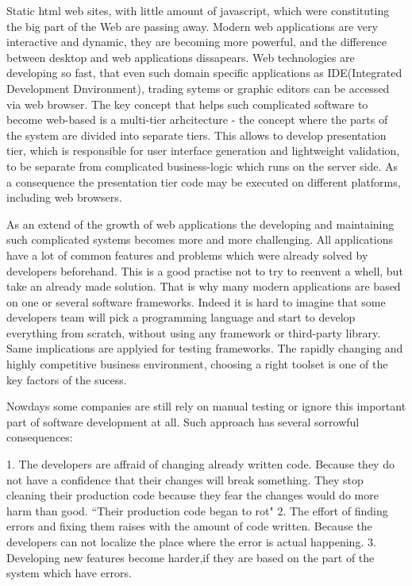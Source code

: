 \documentclass{article}
\begin{document}
		Static html web sites, with little amount of javascript, which were
		constituting the big part of the Web are passing away. Modern web
		applications are very interactive and dynamic, they are becoming
		more powerful, and the difference between desktop and web applications
		dissapears. Web technologies are developing so fast, that even such domain
		specific applications as IDE(Integrated Development Dnvironment), trading
		sytems or graphic editors can be accessed via web browser. The key concept
		that helps such complicated software to become web-based is a multi-tier
		arhcitecture - the concept where the parts of the system are divided into
		separate tiers. This allows to develop presentation tier, which is
		responsible for user interface generation and lightweight validation, to
		be separate from complicated business-logic which runs on the server
		side. As a consequence the presentation tier code may be executed on different
		platforms, including web browsers. 
		
		As an extend of the growth of web applications the developing and maintaining such complicated systems becomes more and more challenging.
		All applications have a lot of common features and problems which
		were already solved by developers beforehand. This is a good practise not to
		try to reenvent a whell, but take an already made solution. That is why many
		modern applications are based on one or several software frameworks. Indeed it
		is hard to imagine that some developers team will pick a programming
		language and start to develop everything from scratch, without using any
		framework or third-party library. Same implications are applyied for testing
		frameworks. The rapidly changing and highly competitive business environment,
		choosing a right toolset is one of the key factors of the sucess. 
		
		Nowdays some companies are still rely on manual testing or ignore this
		important part of software development at all. Such approach has several
		sorrowful consequences:
		
		1. The developers are affraid of changing already written
		code. Because they do not have a confidence that their changes will break something. They
			stop cleaning their production code because they fear the changes would
			do more harm than good. ``Their production code began to rot"
			\cite[p.123]{cleanCode} 
		2. The effort of finding errors and
			fixing them raises with the amount of code written. Because the developers can not localize the place where the error is
		actual happening.
		3. Developing new features become harder,if they are based on the part of the
		system which have errors.
		
\end{document}
